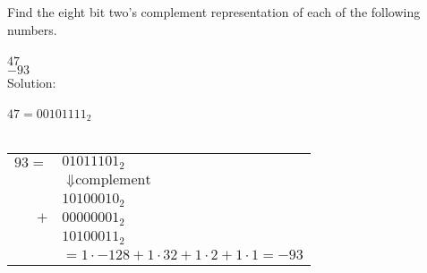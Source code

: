 Find the eight bit two's complement representation of each of the following numbers. \\
\\
$47$ \\
$-93$ \\

Solution: \\
\\
$47 = 00101111_2$\\
\\
\begin{tabular}{rl}
  $93 =$ & $01011101_2$\\
         & $\Downarrow \textrm{complement}$\\
         & $10100010_2$\\
     $+$ & $00000001_2$\\
         & $10100011_2$\\
         & $= 1 \cdot -128 + 1 \cdot 32 + 1 \cdot 2 + 1 \cdot 1 = -93$
\end{tabular}\\
